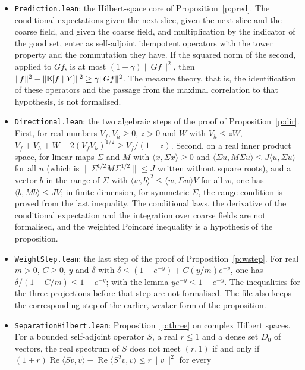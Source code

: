\begin{itemize}
gate indicator and the coarse conditional expectation are such operators, and the bound itself, are not
formalised.
\item \texttt{Prediction.lean}: the Hilbert-space core of Proposition~\ref{p:pred}. The conditional
expectations given the next slice, given the next slice and the coarse field, and given the coarse field,
and multiplication by the indicator of the good set, enter as self-adjoint idempotent operators with the
tower property and the commutation they have. If the squared norm of the second, applied to $Gf$, is at most
$(1-\gamma)\|Gf\|^2$, then $\|f\|^2-\|\mathbb{E}[f\mid Y]\|^2\ge\gamma\|Gf\|^2$. The measure theory, that is, the
identification of these operators and the passage from the maximal correlation to that hypothesis, is not
formalised.
\item \texttt{Directional.lean}: the two algebraic steps of the proof of Proposition~\ref{p:dir}. First, for
real numbers $V_f,V_h\ge0$, $z>0$ and $W$ with $V_h\le zW$,
$V_f+V_h+W-2(V_fV_h)^{1/2}\ge V_f/(1+z)$. Second, on a real inner product space, for linear maps $\Sigma$ and
$M$ with $\langle x,\Sigma x\rangle\ge0$ and $\langle\Sigma u,M\Sigma u\rangle\le J\langle u,\Sigma u\rangle$
for all $u$ (which is $\|\Sigma^{1/2}M\Sigma^{1/2}\|\le J$ written without square roots), and a vector $b$ in
the range of $\Sigma$ with $\langle w,b\rangle^2\le\langle w,\Sigma w\rangle V$ for all $w$, one has
$\langle b,Mb\rangle\le JV$; in finite dimension, for symmetric $\Sigma$, the range condition is proved from
the last inequality. The conditional laws, the derivative of the conditional expectation and the integration
over coarse fields are not formalised, and the weighted Poincar\'e inequality is a hypothesis of the
proposition.
\item \texttt{WeightStep.lean}: the last step of the proof of Proposition~\ref{p:wstep}. For real $m>0$,
$C\ge0$, $y$ and $\delta$ with $\delta\le(1-e^{-y})+C(y/m)e^{-y}$, one has $\delta/(1+C/m)\le1-e^{-y}$; with
the lemma $ye^{-y}\le1-e^{-y}$. The inequalities for the three projections before that step are not
formalised. The file also keeps the corresponding step of the earlier, weaker form of the proposition.
\item \texttt{SeparationHilbert.lean}: Proposition~\ref{p:three} on complex Hilbert spaces. For a bounded
self-adjoint operator $S$, a real $r\le1$ and a dense set $D_0$ of vectors, the real spectrum of $S$ does not
meet $(r,1)$ if and only if
$(1+r)\operatorname{Re}\langle Sv,v\rangle-\operatorname{Re}\langle S^2v,v\rangle\le r\|v\|^2$ for every

\end{itemize}
